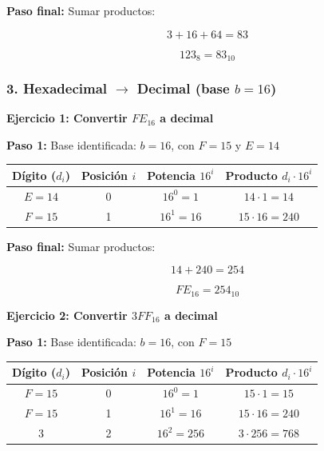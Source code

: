 \documentclass[12pt,twoside]{book}
\begin{document}
						\noindent
						\textbf{Paso final:} Sumar productos:
						
						\[
						3 + 16 + 64 = 83
						\]
						
						\[
						123_8 = 83_{10}
						\]
						
						\subsubsection*{3. Hexadecimal $\rightarrow$ Decimal (base $b=16$)}
						
						\noindent
						\textbf{Ejercicio 1: Convertir $FE_{16}$ a decimal}
						
						\noindent
						\textbf{Paso 1:} Base identificada: $b=16$, con $F=15$ y $E=14$
						
						\begin{center}
							\begin{tabular}{c|c|c|c}
								Dígito ($d_i$) & Posición $i$ & Potencia $16^i$ & Producto $d_i\cdot 16^i$ \\
								\hline
								$E=14$ & 0 & $16^0=1$  & $14\cdot 1 = 14$ \\
								$F=15$ & 1 & $16^1=16$ & $15\cdot 16 = 240$ \\
							\end{tabular}
						\end{center}
						
						\noindent
						\textbf{Paso final:} Sumar productos:
						
						\[
						14 + 240 = 254
						\]
						
						\[
						FE_{16} = 254_{10}
						\]
						
						\noindent
						\textbf{Ejercicio 2: Convertir $3FF_{16}$ a decimal}
						
						\noindent
						\textbf{Paso 1:} Base identificada: $b=16$, con $F=15$
						
						\begin{center}
							\begin{tabular}{c|c|c|c}
								Dígito ($d_i$) & Posición $i$ & Potencia $16^i$ & Producto $d_i\cdot 16^i$ \\
								\hline
								$F=15$ & 0 & $16^0=1$    & $15\cdot 1 = 15$ \\
								$F=15$ & 1 & $16^1=16$   & $15\cdot 16 = 240$ \\
								$3$    & 2 & $16^2=256$  & $3\cdot 256 = 768$ \\
							\end{tabular}
						\end{center}
						
\end{document}
